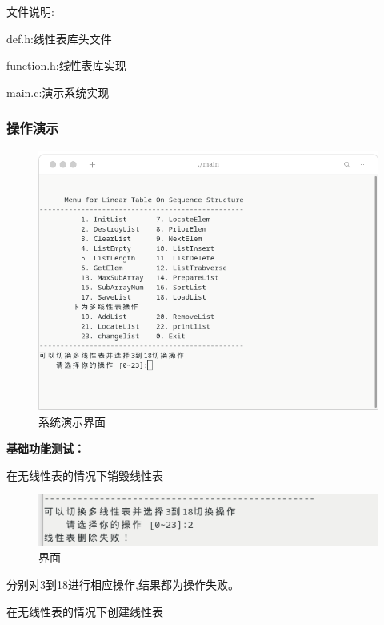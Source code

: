 \documentclass[supercite]{Experimental_Report}
\theoremstyle{definition}
\begin{document}
文件说明:

def.h:线性表库头文件

function.h:线性表库实现

main.c:演示系统实现

\subsubsection{操作演示}

\begin{figure}[!htb]
	\begin{center}
		\includegraphics[scale=0.60]{images/1-1.png}
		\caption{系统演示界面}
		\label{fig1-1}
		\end{center}
\end{figure}

\textbf{基础功能测试：}

在无线性表的情况下销毁线性表

\begin{figure}[!htb]
	\begin{center}
		\includegraphics[scale=0.60]{images/1-2.png}
		\caption{界面}
		\label{fig1-2}
		\end{center}
\end{figure}

分别对3到18进行相应操作,结果都为操作失败。

在无线性表的情况下创建线性表
\end{document}
